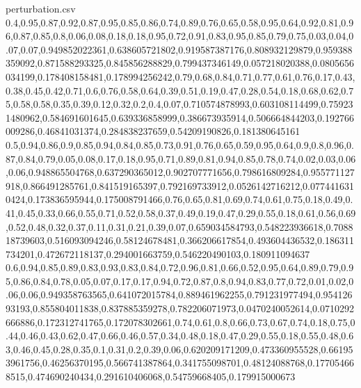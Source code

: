 \documentclass{llncs}
\begin{document}
\begin{filecontents*}{perturbation.csv}
0.4,0.95,0.87,0.92,0.87,0.95,0.85,0.86,0.74,0.89,0.76,0.65,0.58,0.95,0.64,0.92,0.81,0.96,0.87,0.85,0.8,0.06,0.08,0.18,0.18,0.95,0.72,0.91,0.83,0.95,0.85,0.79,0.75,0.03,0.04,0.07,0.07,0.949852022361,0.638605721802,0.919587387176,0.808932129879,0.959388359092,0.871588293325,0.845856288829,0.799437346149,0.057218020388,0.0805656034199,0.178408158481,0.178994256242,0.79,0.68,0.84,0.71,0.77,0.61,0.76,0.17,0.43,0.38,0.45,0.42,0.71,0.6,0.76,0.58,0.64,0.39,0.51,0.19,0.47,0.28,0.54,0.18,0.68,0.62,0.75,0.58,0.58,0.35,0.39,0.12,0.32,0.2,0.4,0.07,0.710574878993,0.603108114499,0.759231480962,0.584691601645,0.639336858999,0.386673935914,0.506664844203,0.192766009286,0.46841031374,0.284838237659,0.54209190826,0.181380645161
0.5,0.94,0.86,0.9,0.85,0.94,0.84,0.85,0.73,0.91,0.76,0.65,0.59,0.95,0.64,0.9,0.8,0.96,0.87,0.84,0.79,0.05,0.08,0.17,0.18,0.95,0.71,0.89,0.81,0.94,0.85,0.78,0.74,0.02,0.03,0.06,0.06,0.948865504768,0.637290365012,0.902707771656,0.798616809284,0.955771127918,0.866491285761,0.841519165397,0.792169733912,0.0526142716212,0.0774416310424,0.173836595944,0.175008791466,0.76,0.65,0.81,0.69,0.74,0.61,0.75,0.18,0.49,0.41,0.45,0.33,0.66,0.55,0.71,0.52,0.58,0.37,0.49,0.19,0.47,0.29,0.55,0.18,0.61,0.56,0.69,0.52,0.48,0.32,0.37,0.11,0.31,0.21,0.39,0.07,0.659034584793,0.548223936618,0.708818739603,0.516093094246,0.58124678481,0.366206617854,0.493604436532,0.186311734201,0.472672118137,0.294001663759,0.546220490103,0.180911094637
0.6,0.94,0.85,0.89,0.83,0.93,0.83,0.84,0.72,0.96,0.81,0.66,0.52,0.95,0.64,0.89,0.79,0.95,0.86,0.84,0.78,0.05,0.07,0.17,0.17,0.94,0.72,0.87,0.8,0.94,0.83,0.77,0.72,0.01,0.02,0.06,0.06,0.949358763565,0.641072015784,0.889461962255,0.791231977494,0.95412693193,0.855804011838,0.837885359278,0.782206071973,0.0470240052614,0.0710292666886,0.172312741765,0.172078302661,0.74,0.61,0.8,0.66,0.73,0.67,0.74,0.18,0.75,0.44,0.46,0.43,0.62,0.47,0.66,0.46,0.57,0.34,0.48,0.18,0.47,0.29,0.55,0.18,0.55,0.48,0.63,0.46,0.45,0.28,0.35,0.1,0.31,0.2,0.39,0.06,0.620209171209,0.473360955528,0.661953961756,0.46256370195,0.566741387864,0.341755098701,0.48124088768,0.177054668515,0.474690240434,0.291610406068,0.54759668405,0.179915000673
\end{filecontents*}
\end{document}
